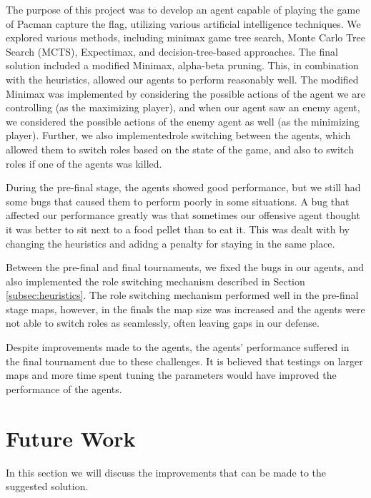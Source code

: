 \documentclass[a4paper,12pt]{article}
\begin{document}
The purpose of this project was to develop an agent capable of playing the game of Pacman capture the flag, utilizing various artificial intelligence techniques. 
We explored various methods, including minimax game tree search, Monte Carlo Tree Search (MCTS), Expectimax, and decision-tree-based approaches. 
The final solution included a modified Minimax, alpha-beta pruning. This, in combination with the heuristics, allowed our agents to perform reasonably well.
The modified Minimax was implemented by considering the possible actions of the agent we are controlling (as the maximizing player), and when our agent saw an enemy agent, we considered the possible actions of the enemy agent as well (as the minimizing player).
Further, we also implementedrole switching between the agents, which allowed them to switch roles based on the state of the game, and also to switch roles if one of the agents was killed.

During the pre-final stage, the agents showed good performance, but we still had some bugs that caused them to perform poorly in some situations. 
A bug that affected our performance greatly was that sometimes our offensive agent thought it was better to sit next to a food pellet than to eat it.
This was dealt with by changing the heuristics and adidng a penalty for staying in the same place.

Between the pre-final and final tournaments, we fixed the bugs in our agents, and also implemented the role switching mechanism described in Section \ref{subsec:heuristics}.
The role switching mechanism performed well in the pre-final stage maps, however, in the finals the map size was increased and the agents were not able to switch roles as seamlessly, often leaving gaps in our defense.

Despite improvements made to the agents, the agents' performance suffered in the final tournament due to these challenges. It is believed that testings on larger maps and more time spent tuning the parameters would have improved the performance of the agents.

















\section{Future Work}
In this section we will discuss the improvements that can be made to the suggested solution. 
\end{document}
